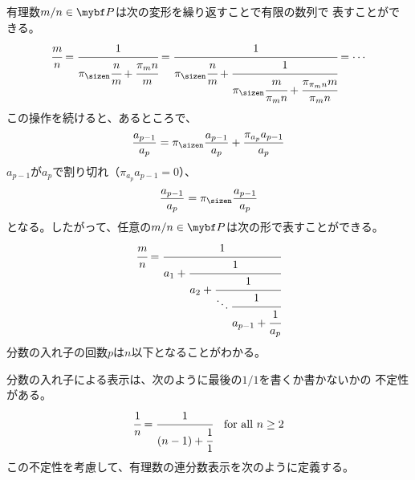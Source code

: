 	有理数$m/n\in\bunsub$は次の変形を繰り返すことで有限の数列で
	表すことができる。
	\begin{equation*}\begin{split}
		\cfrac{m}{n} = \cfrac{1}{\pi_\sizen\cfrac{n}{m} + \cfrac{\pi_mn}{m}}
		= \cfrac{1}{\pi_\sizen\cfrac{n}{m} + \cfrac{1}{\pi_\sizen\cfrac{m}{\pi_mn} + \cfrac{\pi_{\pi_mn}m}{\pi_mn}}}
		= \cdots
	\end{split}\end{equation*}
	この操作を続けると、あるところで、
	\begin{equation*}\begin{split}
		\frac{a_{p-1}}{a_p} = \pi_\sizen\frac{a_{p-1}}{a_p} 
		+ \frac{\pi_{a_p}a_{p-1}}{a_p} 
	\end{split}\end{equation*}
	$a_{p-1}$が$a_p$で割り切れ（$\pi_{a_p}a_{p-1}=0$）、
	\begin{equation*}\begin{split}
		\frac{a_{p-1}}{a_p} = \pi_\sizen\frac{a_{p-1}}{a_p} 
	\end{split}\end{equation*}
	となる。したがって、任意の$m/n\in\bunsub$は次の形で表すことができる。
	\begin{equation*}\begin{split}
		\cfrac{m}{n} &= \cfrac{1}{a_1 + \cfrac{1}{a_2 + \cfrac{1}{\ddots \cfrac{1}{a_{p-1} + \cfrac{1}{a_p}}}}} \\
	\end{split}\end{equation*}
	分数の入れ子の回数$p$は$n$以下となることがわかる。

	分数の入れ子による表示は、次のように最後の$1/1$を書くか書かないかの
	不定性がある。
	\begin{equation*}\begin{split}
		\cfrac{1}{n} = \cfrac{1}{(n-1) + \cfrac{1}{1}}
		\quad\text{for all } n\ge 2
	\end{split}\end{equation*}
	この不定性を考慮して、有理数の連分数表示を次のように定義する。

